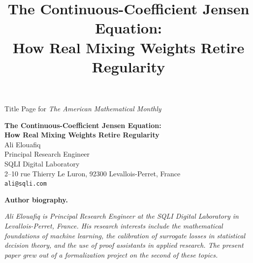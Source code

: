 \documentclass{article}
\theoremstyle{plain}
\theoremstyle{definition}
\begin{document}
\begin{center}
{\LARGE{Title Page for \textit{The American Mathematical Monthly}}}
\end{center}

\vspace{100px}
\begin{center}
\textbf{\large The Continuous-Coefficient Jensen Equation:} \\
\textbf{\large How Real Mixing Weights Retire Regularity} \\
\vspace{30px}
Ali Elouafiq \\
Principal Research Engineer \\
SQLI Digital Laboratory \\
2--10 rue Thierry Le Luron, 92300 Levallois-Perret, France \\
\texttt{ali@sqli.com}
\end{center}

\vspace{20px}
\begin{center}
\textbf{Author biography.}
\begin{minipage}{0.85\linewidth}
\small\itshape
Ali Elouafiq is Principal Research Engineer at the SQLI Digital
Laboratory in Levallois-Perret, France. His research interests
include the mathematical foundations of machine learning, the
calibration of surrogate losses in statistical decision theory, and
the use of proof assistants in applied research. The present paper
grew out of a formalization project on the second of these topics.
\end{minipage}
\end{center}

\pagebreak


\title{The Continuous-Coefficient Jensen Equation:\\
       How Real Mixing Weights Retire Regularity}

\end{document}
